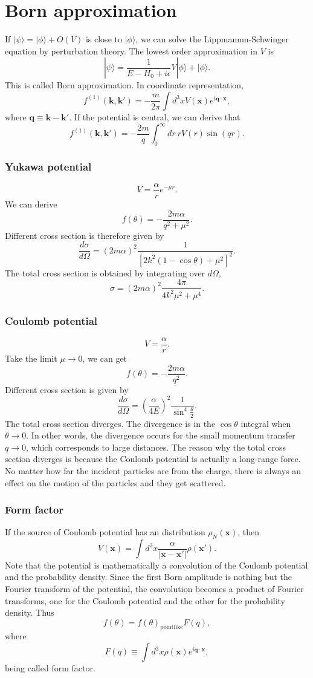 \section{Born approximation}
If $|\psi\rangle = |\phi\rangle + O(V)$ is close to $|\phi\rangle$, we can solve the Lippmanmn-Schwinger equation by perturbation theory. The lowest order approximation in $V$ is
\[|\psi\rangle = \frac{1}{E-H_0 + i\epsilon} V|\phi\rangle + |\phi\rangle.\]
This is called Born approximation. In coordinate representation,
\[f^{(1)}(\bm{k},\bm{k}') = - \frac{m}{2\pi} \int d^3x V(\bm{x}) e^{i\bm{q}\cdot\bm{x}},\]
where $\bm{q} \equiv \bm{k} - \bm{k}'$. If the potential is central, we can derive that
\[f^{(1)}(\bm{k},\bm{k}') = - \frac{2m}{q} \int_0^{\infty} dr \: r V(r) \sin(qr).\]

\subsubsection{Yukawa potential}
\[V = \frac{\alpha}{r}  e^{-\mu r}.\]
We can derive
\[f(\theta) = - \frac{2m\alpha}{q^2 + \mu^2}.\]
Different cross section is therefore given by
\[\frac{d\sigma}{d\Omega} = (2m\alpha)^2 \frac{1}{[2k^2(1-\cos\theta) + \mu^2]^2}.\]
The total cross section is obtained by integrating over $d\Omega$,
\[\sigma = (2m\alpha)^2 \frac{4\pi}{4k^2\mu^2 + \mu^4}.\]

\subsubsection{Coulomb potential}
\[V = \frac{\alpha}{r}.\]
Take the limit $\mu \to 0$, we can get
\[f(\theta) = - \frac{2m\alpha}{q^2}.\]
Different cross section is given by
\[\frac{d\sigma}{d\Omega} = (\frac{\alpha}{4E})^2 \frac{1}{\sin^4{\frac{\theta}{2}}}.\]
The total cross section diverges. The divergence is in the $\cos\theta$ integral when $\theta \to 0$. In other words, the divergence occurs for the small momentum transfer $q \to 0$, which corresponds to large distances.
The reason why the total cross section diverges is because the Coulomb potential is actually a long-range force. No matter how far the incident particles are from the charge, there is always an effect on the motion of the particles and they get scattered.

\subsubsection{Form factor}
\noindent
If the source of Coulomb potential has an distribution $\rho_N(\bm{x})$, then
\[V(\bm{x}) = \int d^3x \frac{\alpha}{|\bm{x}-\bm{x}'|} \rho(\bm{x}').\]
Note that the potential is mathematically a convolution of the Coulomb potential and the probability density. Since the first Born amplitude is nothing but the Fourier transform of the potential, the convolution becomes a product of Fourier transforms, one for the Coulomb potential and the other for the probability density. Thus
\[f(\theta) = f(\theta)_{\mathrm{pointlike}} F(q),\]
where
\[F(q) \equiv \int d^3x \rho(\bm{x}) e^{i \bm{q} \cdot \bm{x}},\]
being called form factor.

